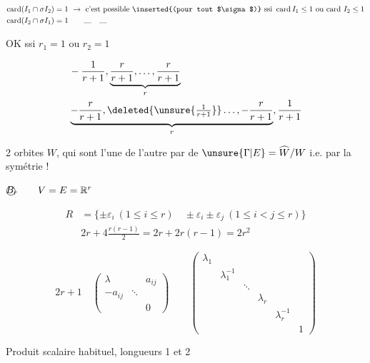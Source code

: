 \[
\begin{aligned}
\operatorname{card}(I_1\cap\sigma I_2)&=1\ \to\ \text{c’est possible \inserted{(pour tout $\sigma$)} ssi }\operatorname{card}I_1\leq1\text{ ou card }I_2\leq1\\
\operatorname{card}(I_2\cap\sigma I_1)&=1\qquad\rule{1em}{.3pt}\quad\rule{1em}{.3pt}
\end{aligned}
\]

 OK ssi $r_1=1$ ou $r_2=1$

\[
\begin{aligned}
&-\frac1{r+1},\underbrace{\frac r{r+1},\ldots,\frac r{r+1}}_r\\
&\underbrace{-\frac r{r+1},\deleted{\unsure{\tfrac1{r+1}}}\ldots,-\frac r{r+1}}_r,\frac1{r+1}
\end{aligned}
\]

2 orbites   $W$, qui sont   l’une de l’autre par   de $\unsure{\Gamma|E}=\widehat W/W$ i.e. par la symétrie !

$\text{\textcircled{$B_r$}}\qquad V=E=\mathbb R^r$

\[
\begin{aligned}
R&=\{\pm\varepsilon_i\ (1\leq i\leq r)\quad\pm\varepsilon_i\pm\varepsilon_j\ (1\leq i<j\leq r)\}\\
&2r+4\frac{r(r-1)}2=2r+2r(r-1)=2r^2
\end{aligned}
\]

\[
2r+1\quad
\begin{pmatrix}\lambda&&a_{ij}\\-a_{ij}&\ddots&\\&&0\end{pmatrix}
\qquad
\begin{pmatrix}\lambda_1\\&\lambda_1^{-1}\\&&\ddots\\&&&\lambda_r\\&&&&\lambda_r^{-1}\\&&&&&1\end{pmatrix}
\]

Produit scalaire habituel, longueurs 1 et 2

